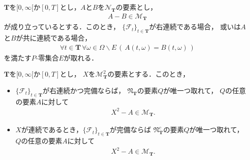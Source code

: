 	\begin{screen}
		\begin{thm}[有界変動なマルチンゲールは殆ど全てのパスが定値]
		\label{thm:martingale_with_bounded_variation_is_constant}
			$\mathbf{T}$を$[0,\infty[$か$[0,T]$とし，$A$と$B$を$\mathscr{N}_{\mathbf{T}}$の要素とし，
			\begin{align}
				A - B \in \mathscr{M}_{\mathbf{T}}
			\end{align}
			が成り立っているとする．このとき，
			$\{\mathscr{F}_t\}_{t \in \mathbf{T}}$が右連続である場合，
			或いは$A$と$B$が共に連続である場合，
			\begin{align}
				\forall t \in \mathbf{T}\, \forall \omega \in \Omega \backslash E\,
				\left(\, A(t,\omega) = B(t,\omega)\, \right)
			\end{align}
			を満たす$P$-零集合$E$が取れる．
		\end{thm}
	\end{screen}
	
	\begin{sketch}\mbox{}
		\begin{description}
			\item[]
		\end{description}
	\end{sketch}
	
	\begin{screen}
		\begin{thm}[二乗可積分マルチンゲールは増大過程とマルチンゲールに分解できる]
		\label{thm:decomposition_of_square_integrable_martingales}
			$\mathbf{T}$を$[0,\infty[$か$[0,T]$とし，
			$X$を$\mathscr{M}^2_{\mathbf{T}}$の要素とする．このとき，
			\begin{itemize}
				\item $\{\mathscr{F}_t\}_{t \in \mathbf{T}}$が右連続かつ完備ならば，
					$\mathfrak{N}_{\mathbf{T}}$の要素$Q$が唯一つ取れて，
					$Q$の任意の要素$A$に対して
					\begin{align}
						X^2 - A \in \mathscr{M}_{\mathbf{T}}.
					\end{align}
					
				\item $X$が連続であるとき，$\{\mathscr{F}_t\}_{t \in \mathbf{T}}$が完備ならば
					$\mathfrak{N}^c_{\mathbf{T}}$の要素$Q$が唯一つ取れて，
					$Q$の任意の要素$A$に対して
					\begin{align}
						X^2 - A \in \mathscr{M}_{\mathbf{T}}.
					\end{align}
			\end{itemize}
		\end{thm}
	\end{screen}
	
